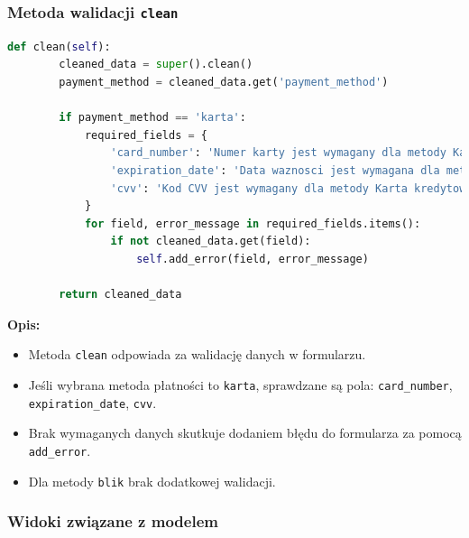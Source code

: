 \documentclass[12pt,a4paper,oneside]{article}
\theoremstyle{definition}
\numberwithin{equation}{section}
\begin{document}
\subsubsection*{Metoda walidacji \texttt{clean}}
\begin{lstlisting}[language=Python, caption=Metoda walidacji clean w PaymentMethodForm]
    def clean(self):
        cleaned_data = super().clean()
        payment_method = cleaned_data.get('payment_method')

        if payment_method == 'karta':
            required_fields = {
                'card_number': 'Numer karty jest wymagany dla metody Karta kredytowa/debetowa.',
                'expiration_date': 'Data waznosci jest wymagana dla metody Karta kredytowa/debetowa.',
                'cvv': 'Kod CVV jest wymagany dla metody Karta kredytowa/debetowa.',
            }
            for field, error_message in required_fields.items():
                if not cleaned_data.get(field):
                    self.add_error(field, error_message)

        return cleaned_data
\end{lstlisting}

\textbf{Opis:}
\begin{itemize}
    \item Metoda \texttt{clean} odpowiada za walidację danych w formularzu.
    \item Jeśli wybrana metoda płatności to \texttt{karta}, sprawdzane są pola: \texttt{card\_number}, \texttt{expiration\_date}, \texttt{cvv}.
    \item Brak wymaganych danych skutkuje dodaniem błędu do formularza za pomocą \texttt{add\_error}.
    \item Dla metody \texttt{blik} brak dodatkowej walidacji.
\end{itemize}

\clearpage
\subsubsection{Widoki związane z modelem}
\end{document}
